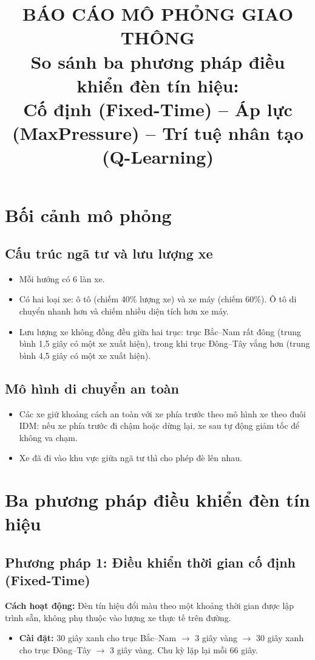 \documentclass[11pt,a4paper]{article}
\title{\textbf{BÁO CÁO MÔ PHỎNG GIAO THÔNG}\\[3pt]
\large So sánh ba phương pháp điều khiển đèn tín hiệu: \\
Cố định (Fixed-Time) -- Áp lực (MaxPressure) -- Trí tuệ nhân tạo (Q-Learning)}
\author{}
\date{}
\begin{document}
\maketitle

\section{Bối cảnh mô phỏng}

\subsection{Cấu trúc ngã tư và lưu lượng xe}
\begin{itemize}[leftmargin=*]
    \item Mỗi hướng có 6 làn xe.
    \item Có hai loại xe: ô tô (chiếm 40\% lượng xe) và xe máy (chiếm 60\%). Ô tô di chuyển nhanh hơn và chiếm nhiều diện tích hơn xe máy.
    \item Lưu lượng xe không đồng đều giữa hai trục: trục Bắc--Nam rất đông (trung bình 1,5 giây có một xe xuất hiện), trong khi trục Đông--Tây vắng hơn (trung bình 4,5 giây có một xe xuất hiện).
\end{itemize}

\subsection{Mô hình di chuyển an toàn}
\begin{itemize}[leftmargin=*]
    \item Các xe giữ khoảng cách an toàn với xe phía trước theo mô hình xe theo đuôi IDM: nếu xe phía trước đi chậm hoặc dừng lại, xe sau tự động giảm tốc để không va chạm.
    \item Xe đã đi vào khu vực giữa ngã tư thì cho phép đè lên nhau.
\end{itemize}

\section{Ba phương pháp điều khiển đèn tín hiệu}

\subsection{Phương pháp 1: Điều khiển thời gian cố định (Fixed-Time)}
\textbf{Cách hoạt động:} Đèn tín hiệu đổi màu theo một khoảng thời gian được lập trình sẵn, không phụ thuộc vào lượng xe thực tế trên đường.
\begin{itemize}[leftmargin=*]
    \item \textbf{Cài đặt:} 30 giây xanh cho trục Bắc--Nam $\rightarrow$ 3 giây vàng $\rightarrow$ 30 giây xanh cho trục Đông--Tây $\rightarrow$ 3 giây vàng. Chu kỳ lặp lại mỗi 66 giây.
\end{itemize}
\end{document}
